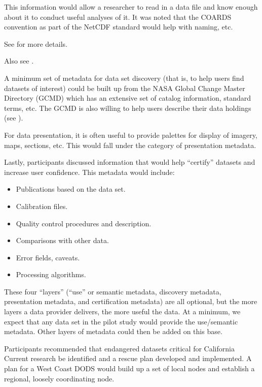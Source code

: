 This information would allow a researcher to read in a data file and
know enough about it to conduct useful analyses of it.  It was noted
that the COARDS convention as part of the NetCDF standard would help
with naming, etc.  

See
 for more
details.  

Also see
.

A minimum set of metadata for data set discovery (that is, to help
users find datasets of interest) could be built up from the NASA
Global Change Master Directory (GCMD) which has an extensive set of
catalog information, standard terms, etc.  The GCMD is also willing to
help users describe their data holdings (see
).

For data presentation, it is often useful to provide palettes for
display of imagery, maps, sections, etc.  This would fall under the
category of presentation metadata.

Lastly, participants discussed information that would help ``certify''
datasets and increase user confidence.  This metadata would include:

\begin{itemize}
\item Publications based on the data set.
\item Calibration files.
\item Quality control procedures and description.
\item Comparisons with other data.
\item Error fields, caveats.
\item Processing algorithms.
\end{itemize}

These four ``layers'' (``use'' or semantic metadata, discovery metadata,
presentation metadata, and certification metadata) are all optional,
but the more layers a data provider delivers, the more useful the
data.  At a minimum, we expect that any data set in the pilot study
would provide the use/semantic metadata.  Other layers of metadata
could then be added on this base.

Participants recommended that endangered datasets critical for
California Current research be identified and a rescue plan developed
and implemented.  A plan for a West Coast DODS would build up a set of
local nodes and establish a regional, loosely coordinating node.

